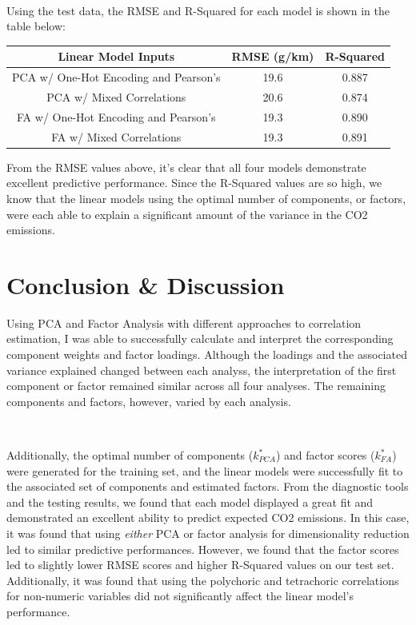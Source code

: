 \documentclass[11pt]{article}
\begin{document}
\

Using the test data, the RMSE and R-Squared for each model is shown in the table below:

\begin{table}[h!]
\centering
\begin{tabular}{c | c c } 
\hline
Linear Model Inputs & RMSE (g/km) & R-Squared\\ 
\hline
PCA w/ One-Hot Encoding and Pearson's  & 19.6  & 0.887\\
PCA w/ Mixed Correlations              & 20.6  & 0.874\\
FA w/ One-Hot Encoding and Pearson's   & 19.3  & 0.890\\
FA w/ Mixed Correlations               & 19.3  & 0.891\\
\hline  
\end{tabular}
\end{table}

From the RMSE values above, it's clear that all four models demonstrate excellent predictive performance. Since the R-Squared values are so high, we know that the linear models using the optimal number of components, or factors, were each able to explain a significant amount of the variance in the CO2 emissions.

\section*{Conclusion \& Discussion}

Using PCA and Factor Analysis with different approaches to correlation estimation, I was able to successfully calculate and interpret the corresponding component weights and factor loadings. Although the loadings and the associated variance explained changed between each analyss, the interpretation of the first component or factor remained similar across all four analyses. The remaining components and factors, however, varied by each analysis.

\

Additionally, the optimal number of components ($k_{PCA}^*$) and factor scores ($k_{FA}^*$) were generated for the training set, and the linear models were successfully fit to the associated set of components and estimated factors. From the diagnostic tools and the testing results, we found that each model displayed a great fit and demonstrated an excellent ability to predict expected CO2 emissions. In this case, it was found that using \textit{either} PCA or factor analysis for dimensionality reduction led to similar predictive performances. However, we found that the factor scores led to slightly lower RMSE scores and higher R-Squared values on our test set. Additionally, it was found that using the polychoric and tetrachoric correlations for non-numeric variables did not significantly affect the linear model's performance.
\end{document}
